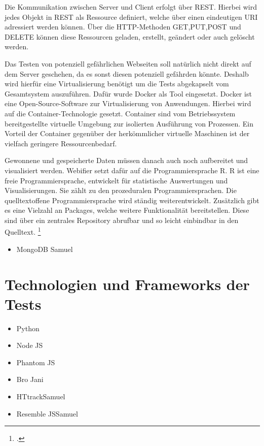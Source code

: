 Die Kommunikation zwischen Server und Client erfolgt über \acl{REST}. Hierbei wird jedes Objekt in \ac{REST} als Ressource definiert, welche über einen eindeutigen \acl{URI} adressiert werden können. Über die HTTP-Methoden GET,PUT,POST und DELETE können diese Ressourcen geladen, erstellt, geändert oder auch gelöscht werden. \cite{rest}

Das Testen von potenziell gefährlichen Webseiten soll natürlich nicht direkt auf dem Server geschehen, da es sonst diesen potenziell gefährden könnte. Deshalb wird hierfür eine Virtualisierung benötigt um die Tests abgekapselt vom Gesamtsystem auszuführen. Dafür wurde Docker als Tool eingesetzt. Docker ist eine Open-Source-Software zur Virtualisierung von Anwendungen. Hierbei wird auf die Container-Technologie gesetzt. Container sind vom Betriebssystem bereitgestellte virtuelle Umgebung zur isolierten Ausführung von Prozessen. Ein Vorteil der Container gegenüber der herkömmlicher virtuelle Maschinen ist der vielfach geringere Ressourcenbedarf.\cite{docker}

Gewonnene und gespeicherte Daten müssen danach auch noch aufbereitet und visualisiert werden. Webifier setzt dafür auf die Programmiersprache R. R ist eine freie Programmiersprache, entwickelt für statistische Auswertungen und Visualisierungen. Sie zählt zu den prozeduralen Programmiersprachen. Die quelltextoffene Programmiersprache wird ständig weiterentwickelt. Zusätzlich gibt es eine Vielzahl an Packages, welche weitere Funktionalität bereitstellen. Diese sind über ein zentrales Repository abrufbar und so leicht einbindbar in den Quelltext. \footcite[Vgl.][1ff]{R}

\begin{itemize}
  \item MongoDB \newline \todo Samuel
\end{itemize}

\section{Technologien und Frameworks der Tests}

\begin{itemize}
    \item Python \newline {}
    \item Node JS
    \item Phantom JS \newline {}
    \item Bro \newline \todo Jani
    \item HTtrack\newline \todo Samuel
    \item Resemble JS\newline \todo Samuel
\end{itemize}


